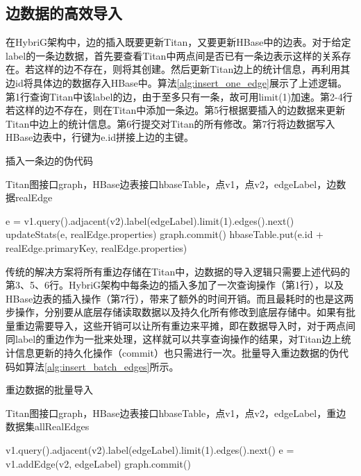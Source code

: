 \subsection{边数据的高效导入}
在HybriG架构中，边的插入既要更新Titan，又要更新HBase中的边表。对于给定label的一条边数据，首先要查看Titan中两点间是否已有一条边表示这样的关系存在。若这样的边不存在，则将其创建。然后更新Titan边上的统计信息，再利用其边id将具体边的数据存入HBase中。算法\ref{alg:insert_one_edge}展示了上述逻辑。第1行查询Titan中该label的边，由于至多只有一条，故可用limit(1)加速。第2-4行若这样的边不存在，则在Titan中添加一条边。第5行根据要插入的边数据来更新Titan中边上的统计信息。第6行提交对Titan的所有修改。第7行将边数据写入HBase边表中，行键为e.id拼接上边的主键。
\begin{algorithm}
\caption{插入一条边的伪代码}
\label{alg:insert_one_edge}
\begin{algorithmic}[1] %
\REQUIRE Titan图接口graph，HBase边表接口hbaseTable，点v1，点v2，edgeLabel，边数据realEdge

\STATE e = v1.query().adjacent(v2).label(edgeLabel).limit(1).edges().next()
\ENDIF
\STATE updateStats(e, realEdge.properties)
\STATE graph.commit()
\STATE hbaseTable.put(e.id + realEdge.primaryKey, realEdge.properties)
\end{algorithmic}
\end{algorithm}

传统的解决方案将所有重边存储在Titan中，边数据的导入逻辑只需要上述代码的第3、5、6行。HybriG架构中每条边的插入多加了一次查询操作（第1行），以及HBase边表的插入操作（第7行），带来了额外的时间开销。而且最耗时的也是这两步操作，分别要从底层存储读取数据以及持久化所有修改到底层存储中。如果有批量重边需要导入，这些开销可以让所有重边来平摊，即在数据导入时，对于两点间同label的重边作为一批来处理，这样就可以共享查询操作的结果，对Titan边上统计信息更新的持久化操作（commit）也只需进行一次。批量导入重边数据的伪代码如算法\ref{alg:insert_batch_edges}所示。
\begin{algorithm}
\caption{重边数据的批量导入}
\label{alg:insert_batch_edges}
\begin{algorithmic}[1] %
\REQUIRE Titan图接口graph，HBase边表接口hbaseTable，点v1，点v2，edgeLabel，重边数据集allRealEdges

\STATE v1.query().adjacent(v2).label(edgeLabel).limit(1).edges().next()
\STATE e = v1.addEdge(v2, edgeLabel)
\ENDIF
{}
\ENDFOR
\STATE graph.commit()
\ENDFOR
\end{algorithmic}
\end{algorithm}

